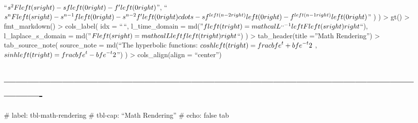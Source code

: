 \documentclass[
  letterpaper,
  DIV=11,
  numbers=noendperiod]{scrartcl}
\begin{document}
``\({s^2}F\\left( s \\right) - sf\\left( 0 \\right) - f'\\left( 0 \\right)\)'',
``\({s^n}F\\left( s \\right) - {s^{n - 1}}f\\left( 0 \\right) - {s^{n - 2}}f'\\left( 0 \\right) \\cdots - s{f^{\\left( {n - 2} \\right)}}\\left( 0 \\right) - {f^{\\left( {n - 1} \\right)}}\\left( 0 \\right)\)''
) ) \textbar\textgreater{} gt() \textbar\textgreater{} fmt\_markdown()
\textbar\textgreater{} cols\_label( idx = ``\,``, l\_time\_domain =
md(''\(f\\left( t \\right) = {\\mathcal{L}^{\\,\\, - 1}}\\left\\{ {F\\left( s \\right)} \\right\\}\)``),
l\_laplace\_s\_domain =
md(''\(F\\left( s \\right) = \\mathcal{L}\\left\\{ {f\\left( t \\right)} \\right\\}\)``)
) \textbar\textgreater{} tab\_header(title =''Math Rendering'')
\textbar\textgreater{} tab\_source\_note( source\_note = md(``The
hyperbolic functions:
\(\\cosh \\left( t \\right) = \\frac{{{{\\bf{e}}^t} + {{\\bf{e}}^{ - t}}}}{2}\)
,
\(\\sinh \\left( t \\right) = \\frac{{{{\\bf{e}}^t} - {{\\bf{e}}^{ - t}}}}{2}\)'')
) \textbar\textgreater{} cols\_align(align = ``center'')

\subsection{-------------------------------------------------------------------------------------------------------------------}\label{section-4}

\#\textbar{} label: tbl-math-rendering \#\textbar{} tbl-cap: ``Math
Rendering'' \#\textbar{} echo: false tab
\end{document}
